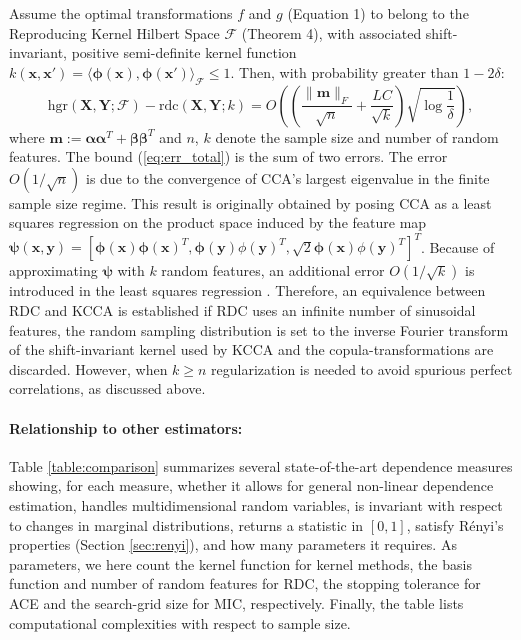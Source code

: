 \documentclass{article}
\begin{document}
Assume the optimal transformations $f$ and $g$ (Equation 1) to belong to the
Reproducing Kernel Hilbert Space $\mathcal{F}$ (Theorem 4), with associated
shift-invariant, positive semi-definite kernel function $k(\bm x, \bm x') =
\langle \bm \phi(\bm x), \bm \phi(\bm x')\rangle_\mathcal{F} \leq 1$. Then, with
probability greater than $1-2\delta$:
\begin{equation}
\label{eq:err_total}
\mathrm{hgr}(\bm X, \bm Y; \mathcal{F}) - 
\mathrm{rdc}(\bm X, \bm Y; k) 
= O\left(\left(\frac{\|\bm
m\|_F}{\sqrt{n}}+\frac{LC}{\sqrt{k}}\right)
 \sqrt{\log\frac{1}{\delta}}\right),\end{equation}
where $\bm m := \bm \alpha \bm \alpha^T +\bm \beta \bm \beta^T$ and $n$, $k$
denote the sample size and number of random features. The bound
(\ref{eq:err_total}) is the sum of two errors. The error $O(1/\sqrt{n})$ is due
to the convergence of CCA's largest eigenvalue in the finite sample size
regime.  This result \cite[Theorem 6]{Hardoon09} is originally obtained by
posing CCA as a least squares regression on the product space induced by the
feature map $\bm \psi(\bm x, \bm y) = [\bm \phi(\bm x)\bm \phi(\bm x)^T, \bm
\phi(\bm y) \phi(\bm y)^T, \sqrt{2}\bm \phi(\bm x) \phi(\bm y)^T]^T$.  Because of
approximating $\bm \psi$ with $k$ random features, an additional error 
$O(1/\sqrt{k})$ is introduced in the least squares regression \cite[Lemma
3]{Rahimi08}. Therefore, an equivalence between RDC and KCCA is established if
RDC uses an infinite number of sinusoidal features, the random sampling distribution is
set to the inverse Fourier transform of the shift-invariant kernel used by KCCA and
the copula-transformations are discarded.
However, when $k \geq n$ regularization
is needed to avoid spurious perfect correlations, as discussed above.

\paragraph{Relationship to other estimators:}\label{sec:comparison} Table
\ref{table:comparison} summarizes several state-of-the-art dependence measures
showing, for each measure, whether it allows for general non-linear dependence
estimation, handles multidimensional random variables, is invariant with
respect to changes in marginal distributions, returns a statistic in $[0,1]$,
satisfy R\'enyi's properties (Section \ref{sec:renyi}), and how many parameters
it requires. As parameters, we here count the kernel function for kernel
methods, the basis function and number of random features for RDC, the stopping
tolerance for ACE and the search-grid size for MIC, respectively. Finally, the
table lists computational complexities with respect to sample size.
\end{document}
